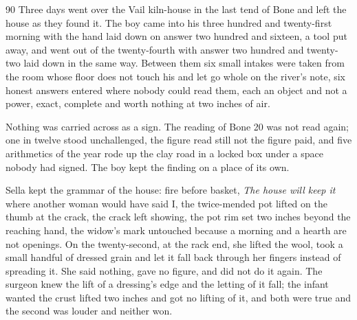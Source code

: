 
\scenebreak


\scenebreak


\scenebreak

\CRtailpiece
\begin{CRchronicle}{90}
Three days went over the Vail kiln-house in the last tend of Bone and left the house as they found it. The boy came into his three hundred and twenty-first morning with the hand laid down on answer two hundred and sixteen, a tool put away, and went out of the twenty-fourth with answer two hundred and twenty-two laid down in the same way. Between them six small intakes were taken from the room whose floor does not touch his and let go whole on the river’s note, six honest answers entered where nobody could read them, each an object and not a power, exact, complete and worth nothing at two inches of air.

Nothing was carried across as a sign. The reading of Bone 20 was not read again; one in twelve stood unchallenged, the figure read still not the figure paid, and five arithmetics of the year rode up the clay road in a locked box under a space nobody had signed. The boy kept the finding on a place of its own.

Sella kept the grammar of the house: fire before basket, \emph{The house will keep it} where another woman would have said I, the twice-mended pot lifted on the thumb at the crack, the crack left showing, the pot rim set two inches beyond the reaching hand, the widow’s mark untouched because a morning and a hearth are not openings. On the twenty-second, at the rack end, she lifted the wool, took a small handful of dressed grain and let it fall back through her fingers instead of spreading it. She said nothing, gave no figure, and did not do it again. The surgeon knew the lift of a dressing’s edge and the letting of it fall; the infant wanted the crust lifted two inches and got no lifting of it, and both were true and the second was louder and neither won.


\end{CRchronicle}
